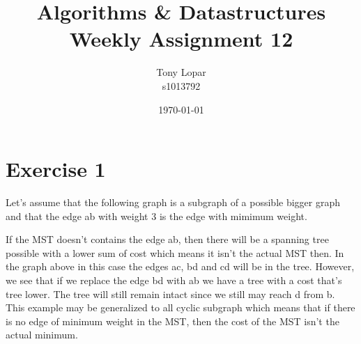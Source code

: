\documentclass{article}
\begin{document}
\title{Algorithms \& Datastructures \\ Weekly Assignment 12}
\date{\today}
\author{Tony Lopar \\ s1013792}
\maketitle
\section*{Exercise 1}

Let's assume that the following graph is a subgraph of a possible bigger graph and that the edge ab with weight 3 is the edge with mimimum weight.

\begin{center}
\end{center}
If the MST doesn't contains the edge ab, then there will be a spanning tree possible with a lower sum of cost which means it isn't the actual MST then. In the graph above in this case the edges ac, bd and cd will be in the tree. However, we see that if we replace the edge bd with ab we have a tree with a cost that's tree lower. The tree will still remain intact since we still may reach d from b. This example may be generalized to all cyclic subgraph which means that if there is no edge of minimum weight in the MST, then the cost of the MST isn't the actual minimum.
\end{document}
